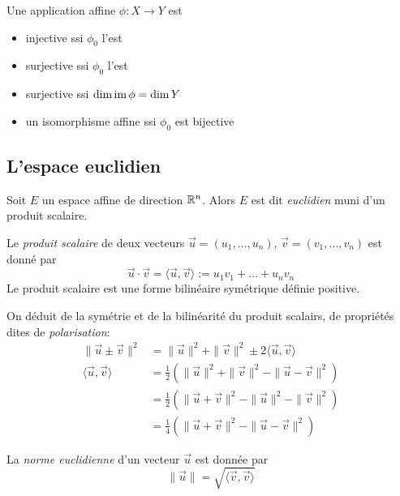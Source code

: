 \begin{corollary}
	Une application affine $\phi:X\to Y$ est
	\begin{itemize}
		\item injective ssi $\phi_0$ l'est
		\item surjective ssi $\phi_0$ l'est
		\item surjective ssi $\dim \operatorname{im} \phi = \dim Y$
		\item un isomorphisme affine ssi $\phi_0$ est bijective
	\end{itemize}
\end{corollary}

\subsection{L'espace euclidien}

\begin{definition}
	Soit $E$ un espace affine de direction $\mathbb{R}^n$. Alors $E$ est dit
	\emph{euclidien} muni d'un produit scalaire.
\end{definition}

\begin{definition}
	Le \emph{produit scalaire} de deux vecteurs $\vec{u} = (u_1, \dots, u_n)$,
	$\vec{v} = (v_1, \dots, v_n)$ est donné par
	\begin{equation*}
		\vec{u} \cdot \vec{v} = \langle \vec{u}, \vec{v} \rangle := 
		u_1v_1 + \dots + u_nv_n
	\end{equation*}
	Le produit scalaire est une forme bilinéaire symétrique définie positive.
\end{definition}

\begin{proposition}
	On déduit de la symétrie et de la bilinéarité du produit scalairs, de
	propriétés dites de \emph{polarisation}:
	\begin{align*}
		\|\vec{u} \pm \vec{v}\|^2 &= \|\vec{u}\|^2 + \|\vec{v}\|^2 \pm 2 \langle \vec{u},
		\vec{v} \rangle \\
		\langle \vec{u}, \vec{v} \rangle &= \frac{1}{2}(\|\vec{u}\|^2 +
			\|\vec{v}\|^2 - \|\vec{u} - \vec{v}\|^2) \\
		&= \frac{1}{2}(\|\vec{u} + \vec{v} \|^2 - \|\vec{u}\|^2 - \|\vec{v}\|^2)\\
		&= \frac{1}{4}(\|\vec{u} + \vec{v}\|^2 - \|\vec{u} - \vec{v}\|^2)
	\end{align*}
\end{proposition}

\begin{definition}
	La \emph{norme euclidienne} d'un vecteur $\vec{u}$ est donnée
	par 
	\begin{equation*}
		\|\vec{u}\| = \sqrt{\langle \vec{v}, \vec{v} \rangle}
	\end{equation*}
\end{definition}

